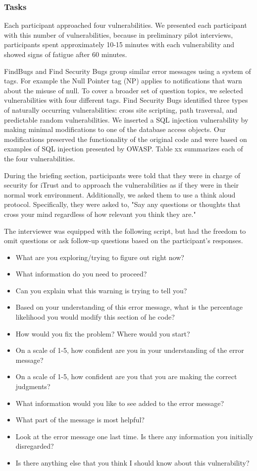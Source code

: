 \documentclass[conference]{IEEEtran}
\begin{document}
\subsubsection{Tasks}
Each participant approached four vulnerabilities. 
We presented each participant with this number of vulnerabilities, because in preliminary pilot interviews, participants spent approximately 10-15 minutes with each vulnerability and showed signs of fatigue after 60 minutes.

FindBugs and Find Security Bugs group similar error messages using a system of tags. For example the Null Pointer tag (NP) applies to notifications that warn about the misuse of null. To cover a broader set of question topics, we selected vulnerabilities with four different tags.
Find Security Bugs identified three types of naturally occurring vulnerabilities: cross site scripting, path traversal, and predictable random vulnerabilities.
We inserted a SQL injection vulnerability by making minimal modifications to one of the database access objects.
Our modifications preserved the functionality of the original code and were based on examples of SQL injection presented by OWASP.
Table xx summarizes each of the four vulnerabilities. 

During the briefing section, participants were told that they were in charge of security for iTrust and to approach the vulnerabilities as if they were in their normal work environment.
Additionally, we asked them to use a think aloud protocol. Specifically, they were asked to, "Say any questions or thoughts that cross your mind regardless of how relevant you think they are."

The interviewer was equipped with the following script, but had the freedom to omit questions or ask follow-up questions based on the participant's responses.
\begin{itemize}
\item What are you exploring/trying to figure out right now?
\item What information do you need to proceed?
\item Can you explain what this warning is trying to tell you?
\item Based on your understanding of this error message, what is the percentage likelihood you would modify this section of he code?
\item How would you fix the problem? Where would you start?
\item On a scale of 1-5, how confident are you in your understanding of the error message?
\item On a scale of 1-5, how confident are you that you are making the correct judgments?
\item What information would you like to see added to the error message?
\item What part of the message is most helpful?
\item Look at the error message one last time. Is there any information you initially disregarded?
\item Is there anything else that you think I should know about this vulnerability?

\end{itemize}
\end{document}
